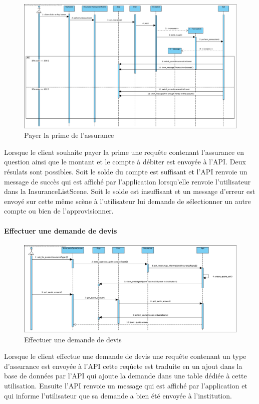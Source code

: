 \documentclass[../rapport.tex]{subfiles}
\begin{document}
						\begin{figure}[h]
								\centering\includegraphics[scale=0.3]{ressources/photos_diagrammes/extensionThomas/payerLaPrime.jpg}
								\caption{Payer la prime de l'assurance}
						\end{figure}

						Lorsque le client souhaite payer la prime une requête contenant l'assurance en question ainsi que le montant et le compte à débiter est envoyée
						à l'API. Deux résulats sont possibles. Soit le solde du compte est suffisant et l'API renvoie un message de succès qui est affiché par
						l'application lorsqu'elle renvoie l'utilisateur dans la InsuranceListScene. Soit le solde est insuffisant et un message d'erreur est envoyé 
						sur cette même scène à l'utilisateur lui demande de sélectionner un autre compte ou bien de l'approvisionner.

\newpage

				\paragraph{Effectuer une demande de devis}

						\begin{figure}[h]
								\centering\includegraphics[scale=0.3]{ressources/photos_diagrammes/extensionThomas/demanderDevis.jpg}
								\caption{Effectuer une demande de devis}
						\end{figure}
						Lorsque le client effectue une demande de devis une requête contenant un type d'assurance est envoyée à l'API cette reqûete est traduite en un ajout
						dans la base de données par l'API qui ajoute la demande dans une table dédiée à cette utilisation. Ensuite l'API renvoie un message qui est affiché
						par l'application et qui informe l'utilisateur que sa demande a bien été envoyée à l'institution. 
\end{document}
